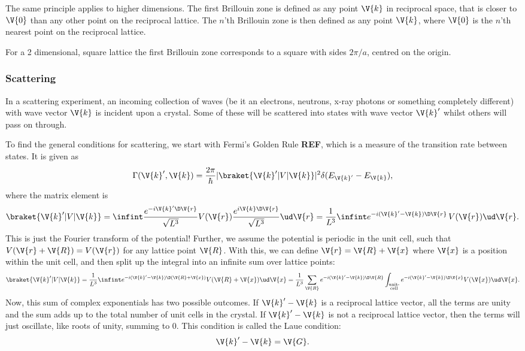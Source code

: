 \documentclass[main.tex]{subfiles}
\begin{document}
	The same principle applies to higher dimensions. The first Brillouin zone is defined as any point $ \V{k} $ in reciprocal space, that is closer to $ \V{0} $ than any other point on the reciprocal lattice. The $ n $'th Brillouin zone is then defined as any point $ \V{k} $, where $ \V{0} $ is the $ n $'th nearest point on the reciprocal lattice.
	
	For a 2 dimensional, square lattice the first Brillouin zone corresponds to a square with sides $ 2\pi /a $, centred on the origin.
	
	\subsubsection{Scattering}
	In a scattering experiment, an incoming collection of waves (be it an electrons, neutrons, x-ray photons or something completely different) with wave vector $ \V{k} $ is incident upon a crystal. Some of these will be scattered into states with wave vector $ \V{k}' $ whilst others will pass on through. 
	
	To find the general conditions for scattering, we start with Fermi's Golden Rule \textbf{REF}, which is a measure of the transition rate between states. It is given as
	\begin{equation}\label{eq:Scat_fermi}
		\Gamma(\V{k}', \V{k}) = \frac{2\pi}{\hbar}|\braket{\V{k}' | V | \V{k}}|^2 \delta(E_{\V{k}'}-E_{\V{k}}),
	\end{equation}
	where the matrix element is
	\begin{equation}\label{eq:Scat_mat_el_initial}
		\braket{\V{k}' | V | \V{k}} = \infint \frac{e^{-i \V{k}'\D\V{r}}}{\sqrt{L^3}} V(\V{r}) \frac{e^{i \V{k}\D\V{r}}}{\sqrt{L^3}} \ud \V{r} = \frac{1}{L^3} \infint e^{-i(\V{k}'-\V{k}) \D \V{r}} \, V(\V{r}) \ud \V{r}.
	\end{equation}
	This is just the Fourier transform of the potential! Further, we assume the potential is periodic in the unit cell, such that $ V(\V{r} + \V{R}) =  V(\V{r}) $ for any lattice point $ \V{R} $. With this, we can define $ \V{r} = \V{R} + \V{x} $ where $ \V{x} $ is a position within the unit cell, and then split up the integral into an infinite sum over lattice points:
	\begin{equation}\label{eq:Scat_mat_el}
		\braket{\V{k}' | V | \V{k}} = \frac{1}{L^3}\infint e^{-i(\V{k}'-\V{k})\D(\V{R}+\V{x})} V(\V{R}+ \V{x}) \ud \V{x} = \frac{1}{L^3} \sum_{\V{R}} e^{-i(\V{k}'-\V{k}) \D \V{R}}\int_{\substack{\text{unit-} \\\text{cell}}} e^{-i (\V{k}'-\V{k}) \D \V{x}} V(\V{x}) \ud \V{x}.
	\end{equation}
	Now, this sum of complex exponentials has two possible outcomes. If $ \V{k}'-\V{k} $ is a reciprocal lattice vector, all the terms are unity and the sum adds up to the total number of unit cells in the crystal. If $ \V{k}'-\V{k} $ is not a reciprocal lattice vector, then the terms will just oscillate, like roots of unity, summing to 0. This condition is called the Laue condition:
	\begin{equation}\label{eq:Scat_Laue}
		\V{k}' - \V{k} =  \V{G}.
	\end{equation}
	
\end{document}
